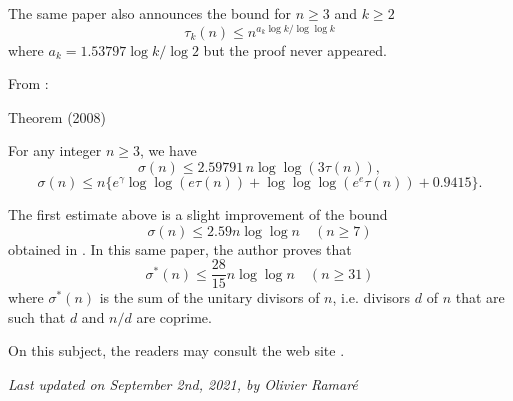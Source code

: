The same paper also announces the bound for $n\ge3$ and $k\ge2$
$$
\tau_k(n)\le n^{a_k\log k/\log\log k}
$$
where $a_k=1.53797\log k / \log 2$ but the proof never appeared.

From \cite{Nicolas*08}:

\begin{thm}{Theorem (2008)}

For any integer $n\ge3$, we have
  $$\sigma(n)\le 2.59791\, n\log\log(3\tau(n)),$$
  $$\sigma(n)\le n\{ e^\gamma\log\log(e\tau(n))+\log\log\log(e^e\tau(n))+0.9415\}.$$
\end{thm}


The first estimate above is a slight improvement of the bound
  $$\sigma(n)\le 2.59 n\log\log n\quad(n\ge7)$$
obtained in
\cite{Ivic*77}.
In this same paper,
  the author proves that
$$\sigma^*(n)\le \frac{28}{15} n\log\log n\quad(n\ge31)$$
where $\sigma^*(n)$ is the sum of the unitary divisors of $n$, i.e. divisors
  $d$ of $n$ that are such that $d$ and $n/d$ are coprime.

\par 
\par 
\par 
On this subject, the readers may consult the web site
\cite{Nicolas*21}.





  
\begin{flushright}\small\sl{}   Last updated on September 2nd, 2021, by Olivier Ramar\'e
 \end{flushright}














